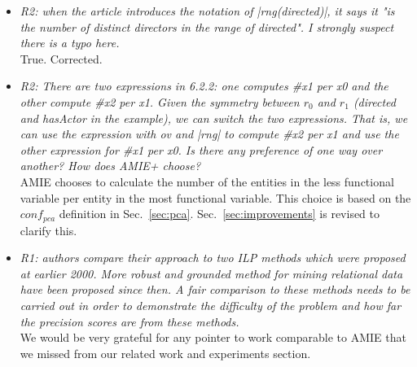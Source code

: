 \begin{figure*}[t!]
\begin{minipage}{.8\textwidth}
\begin{itemize}
   \item \textit{R2: when the article introduces the notation of |rng(directed)|, it says it "is the number of distinct directors in the range of directed". I strongly suspect there is a typo here. \\  }
   True. Corrected.
   
   \item \textit{R2: There are two expressions in 6.2.2: one computes \#x1 per x0 and the other compute \#x2 per x1. 
   Given the symmetry between $r_0$ and $r_1$ (directed and hasActor in the example), we can switch the two expressions. 
   That is, we can use the expression with ov and |rng| to compute \#x2 per x1 and use the other expression for \#x1 per x0. 
   Is there any preference of one way over another? How does AMIE+ choose?\\  }
   AMIE chooses to calculate the number of the entities in the less functional variable per entity in the most functional variable.
   This choice is based on the $conf_{pca}$ definition in Sec.~\ref{sec:pca}.
   Sec.~\ref{sec:improvements} is revised to clarify this.
   
   
   
   
   
   \item \textit{R1: authors compare their approach to two ILP methods which were proposed at earlier 2000. More robust and grounded method for mining relational data have been proposed since then. A fair
comparison to these methods needs to be carried out in order to demonstrate the difficulty of the problem and how far the precision scores are from these methods.\\  }
We would be very grateful for any pointer to work comparable to AMIE that we missed from our related work and experiments section.

   
   
     \end{itemize}
\end{minipage}
\end{figure*}

